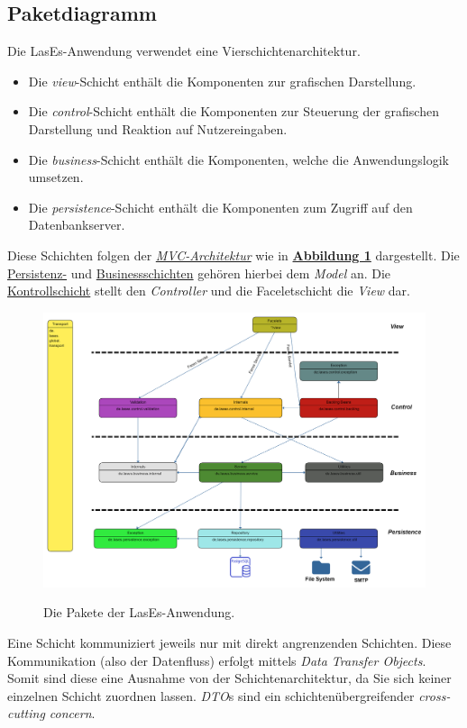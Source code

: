 
\subsection{Paketdiagramm}

Die LasEs-Anwendung verwendet eine Vierschichtenarchitektur.
\begin{itemize}
    \item Die \emph{view}-Schicht enthält die Komponenten zur grafischen Darstellung.
    \item Die \emph{control}-Schicht enthält die Komponenten zur Steuerung der grafischen Darstellung und Reaktion auf
    Nutzereingaben.
    \item Die \emph{business}-Schicht enthält die Komponenten, welche die Anwendungslogik umsetzen.
    \item Die \emph{persistence}-Schicht enthält die Komponenten zum Zugriff auf den Datenbankserver.
\end{itemize}
Diese Schichten folgen der \emph{\hyperref[arch:mvc]{MVC-Architektur}} wie in
\textbf{\hyperref[feinarch:pakdia]{Abbildung 1}} dargestellt.
Die \hyperref[arch:persistence]{Persistenz-} und
\hyperref[arch:business]{Businessschichten} gehören hierbei
dem \emph{Model} an. Die \hyperref[arch:control]{Kontrollschicht} stellt den \emph{Controller} und die
Faceletschicht die \emph{View} dar.
\begin{figure}[H]
    \centering
    \includegraphics[width=0.8\linewidth]{graphics/Paketdiagramm13.0}\label{feinarch:pakdia}
    \caption{Die Pakete der LasEs-Anwendung.}
\end{figure}

Eine Schicht kommuniziert jeweils nur mit direkt angrenzenden Schichten.
Diese Kommunikation (also der Datenfluss) erfolgt mittels \emph{Data Transfer Objects}.
Somit sind diese eine Ausnahme von der Schichtenarchitektur, da Sie sich keiner
einzelnen Schicht zuordnen lassen.
\emph{DTO}s sind ein schichtenübergreifender \emph{cross-cutting concern}.

